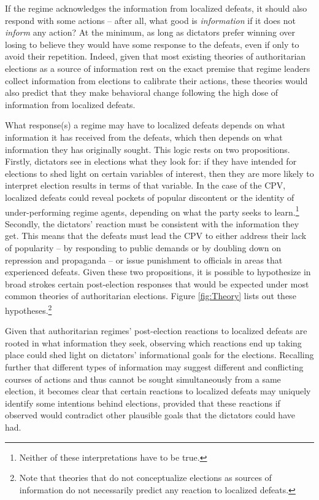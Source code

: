 \documentclass[12pt]{article}
\newcommand{\1}{\mathbbm{1}}
\begin{document}
If the regime acknowledges the information from localized defeats, it should also respond with some actions -- after all, what good is \textit{information} if it does not \textit{inform} any action? At the minimum, as long as dictators prefer winning over losing to believe they would have some response to the defeats, even if only to avoid their repetition. Indeed, given that most existing theories of authoritarian elections as a source of information rest on the exact premise that regime leaders collect information from elections to calibrate their actions, these theories would also predict that they make behavioral change following the high dose of information from localized defeats. 

What response(s) a regime may have to localized defeats depends on what information it has received from the defeats, which then depends on what information they has originally sought. This logic rests on two propositions. Firstly, dictators see in elections what they look for: if they have intended for elections to shed light on certain variables of interest, then they are more likely to interpret election results in terms of that variable. In the case of the CPV, localized defeats could reveal pockets of popular discontent or the identity of under-performing regime agents, depending on what the party seeks to learn.\footnote{Neither of these interpretations have to be true.} Secondly, the dictators' reaction must be consistent with the information they get. This means that the defeats must lead the CPV to either address their lack of popularity -- by responding to public demands or by doubling down on repression and propaganda -- or issue punishment to officials in areas that experienced defeats. Given these two propositions, it is possible to hypothesize in broad strokes certain post-election responses that would be expected under most common theories of authoritarian elections. Figure \ref{fig:Theory} lists out these hypotheses.\footnote{Note that theories that do not conceptualize elections as sources of information \citep[e.g][]{AR2005, Cox2009} do not necessarily predict any reaction to localized defeats.}

Given that authoritarian regimes' post-election reactions to localized defeats are rooted in what information they seek, observing which reactions end up taking place could shed light on dictators' informational goals for the elections. Recalling further that different types of information may suggest different and conflicting courses of actions and thus cannot be sought simultaneously from a same election, it becomes clear that certain reactions to localized defeats may uniquely identify some intentions behind elections, provided that these reactions if observed would contradict other plausible goals that the dictators could have had.
\end{document}
